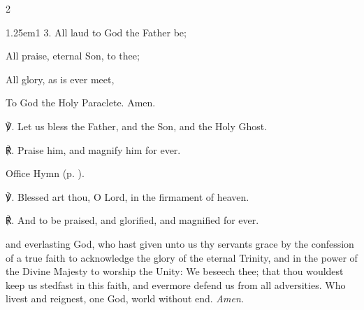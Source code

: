 \begin{paracol}{2}
\begin{hangparas}{1.25em}{1}
3. All laud to God the Father be;

All praise, eternal Son, to thee;

All glory, as is ever meet,

To God the Holy Paraclete. Amen.\\
\end{hangparas}

℣. Let us bless the Father, and the Son, and the Holy Ghost.

℟. Praise him, and magnify him for ever.


\fussy
\end{paracol}


\secondEvensong
{}

\begin{rubric}
	Office Hymn  (p. \pageref{SaturdayEvensong}).
\end{rubric}

℣. Blessed art thou, O Lord, in the firmament of heaven.

℟. And to be praised, and glorified, and magnified for ever.


\collect
{} and everlasting God, who hast given unto us thy servants grace by the confession of a true faith to acknowledge the glory of the eternal Trinity, and in the power of the Divine Majesty to worship the Unity: We beseech thee; that thou wouldest keep us stedfast in this faith, and evermore defend us from all adversities. Who livest and reignest, one God, world without end. \textit{Amen.}


\clearpage
{}\label{CorpusChristi}

\vspace{-0.5\baselineskip}

